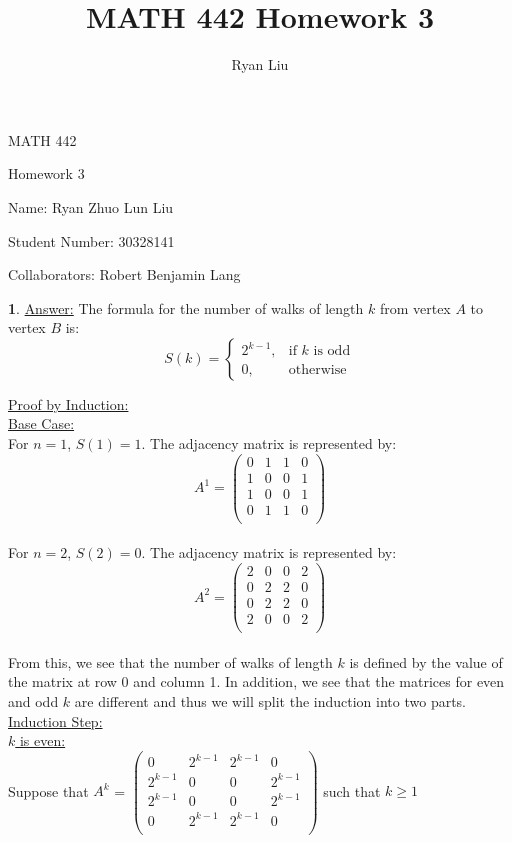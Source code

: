 \documentclass[12pt,a4paper]{article}
\author{Ryan Liu}
\title{MATH 442 Homework 3}
\theoremstyle{definition}
\newtheorem{problem}{}
\begin{document}
\begin{center}
{\huge MATH 442 \par}
{\Large Homework  3  \par}
{\normalsize Name: Ryan Zhuo Lun Liu \par}
{\normalsize Student Number: 30328141 \par}
{\normalsize Collaborators: Robert Benjamin Lang}
\end{center}

\begin{problem}
\underline{Answer:} The formula for the number of walks of length $k$ from vertex $A$ to vertex $B$ is: \\

\[
    S(k) = 
\begin{cases}
    2^{k - 1},& \text{if } k \text{ is odd} \\
    0,              & \text{otherwise}
\end{cases}
\] 

\underline{Proof by Induction:} \\
\underline{Base Case:} \\
For $n = 1$, $S(1) = 1$. The adjacency matrix is represented by: \\
\[
A^1 = 
\begin{pmatrix}
    0&1&1&0\\
    1&0&0&1\\
    1&0&0&1\\
    0&1&1&0\\
\end{pmatrix} 
\] \\

For $n = 2$, $S(2) = 0$. The adjacency matrix is represented by: \\
\[
A^2 = 
\begin{pmatrix}
    2&0&0&2\\
    0&2&2&0\\
    0&2&2&0\\
    2&0&0&2\\
\end{pmatrix}
\] \\

From this, we see that the number of walks of length $k$ is defined by the value of the matrix at row 0 and column 1. In addition, we see that the matrices for even and odd $k$ are different and thus we will split the induction into two parts.\\

\underline{Induction Step:} \\
\underline{$k$ is even:} \\
Suppose that $A^k$ = $\begin{pmatrix}
    0&2^{k - 1}&2^{k - 1}&0\\
    2^{k - 1}&0&0&2^{k - 1}\\
    2^{k - 1}&0&0&2^{k - 1}\\
    0&2^{k - 1}&2^{k - 1}&0\\
\end{pmatrix}$  such that $k \geq 1$ \\\\


\end{problem}
\end{document}
